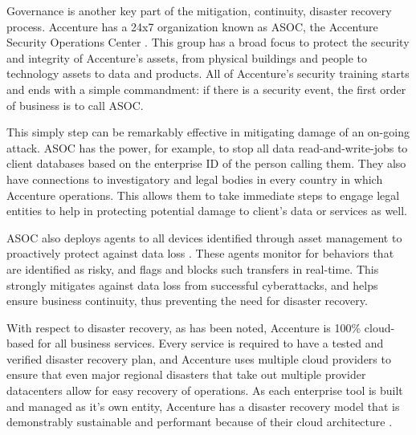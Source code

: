 Governance is another key part of the mitigation, continuity, disaster recovery process. Accenture has a 24x7 organization known as ASOC, the Accenture Security Operations Center \parencite{accentureEmpoweringOurPeople2021}. This group has a broad focus to protect the security and integrity of Accenture's assets, from physical buildings and people to technology assets to data and products. All of Accenture's security training starts and ends with a simple commandment: if there is a security event, the first order of business is to call ASOC.

This simply step can be remarkably effective in mitigating damage of an on-going attack. ASOC has the power, for example, to stop all data read-and-write-jobs to client databases based on the enterprise ID of the person calling them. They also have connections to investigatory and legal bodies in every country in which Accenture operations. This allows them to take immediate steps to engage legal entities to help in protecting potential damage to client's data or services as well.

ASOC also deploys agents to all devices identified through asset management to proactively protect against data loss \parencite{accentureDataLossPrevention2021}. These agents monitor for behaviors that are identified as risky, and flags and blocks such transfers in real-time. This strongly mitigates against data loss from successful cyberattacks, and helps ensure business continuity, thus preventing the need for disaster recovery.

With respect to disaster recovery, as has been noted, Accenture is 100\% cloud-based for all business services. Every service is required to have a tested and verified disaster recovery plan, and Accenture uses multiple cloud providers to ensure that even major regional disasters that take out multiple provider datacenters allow for easy recovery of operations. As each enterprise tool is built and managed as it's own entity, Accenture has a disaster recovery model that is demonstrably sustainable and performant because of their cloud architecture \parencite{andradePerformabilityEvaluationCloudBased2019}.
